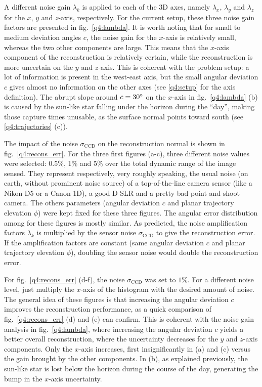 \documentclass{report}
\begin{document}
A different noise gain $\lambda_k$ is applied to each of the 3D axes, namely $\lambda_x$, $\lambda_y$ and $\lambda_z$ for the $x$, $y$ and $z$-axis, respectively. For the current setup, these three noise gain factors are presented in fig.~\ref{q4:lambda}. It is worth noting that for small to medium deviation angles $c$, the noise gain for the $x$-axis is relatively small, whereas the two other components are large. This means that the $x$-axis component of the reconstruction is relatively certain, while the reconstruction is more uncertain on the $y$ and $z$-axis. This is coherent with the problem setup: a lot of information is present in the west-east axis, but the small angular deviation $c$ gives almost no information on the other axes (see \ref{q4:setup} for the axis definition). The abrupt slope around $c = 30\degree$ on the $x$-axis in fig.~\ref{q4:lambda} (b) is caused by the sun-like star falling under the horizon during the ``day'', making those capture times unusable, as the surface normal points toward south (see \ref{q4:trajectories} (c)).

The impact of the noise $\sigma_\text{CCD}$ on the reconstruction normal is shown in fig.~\ref{q4:recons_err}. For the three first figures (a-c), three different noise values were selected: 0.5\%, 1\% and 5\% over the total dynamic range of the image sensed. They represent respectively, very roughly speaking, the usual noise (on earth, without prominent noise source) of a top-of-the-line camera sensor (like a Nikon D5 or a Canon 1D), a good D-SLR and a pretty bad point-and-shoot camera. The others parameters (angular deviation $c$ and planar trajectory elevation $\phi$) were kept fixed for these three figures. The angular error distribution among for these figures is mostly similar. As predicted, the noise amplification factors $\lambda_k$ is multiplied by the sensor noise $\sigma_\text{CCD}$ to give the reconstruction error. If the amplification factors are constant (same angular deviation $c$ and planar trajectory elevation $\phi$), doubling the sensor noise would double the reconstruction error.

For fig.~\ref{q4:recons_err} (d-f), the noise $\sigma_\text{CCD}$ was set to $1\%$. For a different noise level, just multiply the $x$-axis of the histogram with the desired amount of noise. The general idea of these figures is that increasing the angular deviation $c$ improves the reconstruction performance, as a quick comparison of fig.~\ref{q4:recons_err} (d) and (e) can confirm. This is coherent with the noise gain analysis in fig.~\ref{q4:lambda}, where increasing the angular deviation $c$ yields a better overall reconstruction, where the uncertainty decreases for the $y$ and $z$-axis components. Only the $x$-axis increases, first insignificantly in (a) and (c) versus the gain brought by the other components. In (b), as explained previously, the sun-like star is lost below the horizon during the course of the day, generating the bump in the $x$-axis uncertainty.
\end{document}
